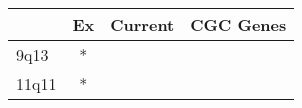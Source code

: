 \begin{tabular}{lccr}
\toprule
{} & Ex & Current & CGC Genes \\
\midrule
9q13  &  * &         &           \\
11q11 &  * &         &           \\
\bottomrule
\end{tabular}
